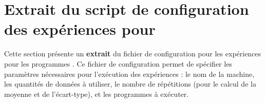\chapter{Extrait du script de configuration des expériences pour }

\label{ExperiencesPreliminairesWordCount.ann}

Cette section pr\'esente un \textbf{extrait} du fichier de
configuration pour les expériences pour les programmes
. Ce fichier de configuration permet de sp\'ecifier les
param\`etres nécessaires pour l'ex\'ecution des exp\'eriences : le nom
de la machine, les quantit\'es de donn\'ees à utiliser, le nombre de
r\'ep\'etitions (pour le calcul de la moyenne et de l'écart-type), et
les programmes \`a ex\'ecuter.


\pagebreak






